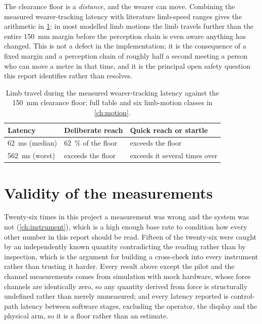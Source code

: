 The clearance floor is a \emph{distance}, and the wearer can move. Combining
the measured wearer-tracking latency with literature limb-speed ranges gives
the arithmetic in \cref{tab:reaction-compact}: in most modelled limb motions
the limb travels further than the entire \SI{150}{\milli\metre} margin before
the perception chain is even aware anything has changed. This is not a
defect in the implementation; it is the consequence of a fixed margin and a
perception chain of roughly half a second meeting a person who can move a
metre in that time, and it is the principal open safety question this report
identifies rather than resolves.

\begin{table}[htbp]
  \centering
  \small
  \caption[The reaction budget, condensed]{Limb travel during the measured
  wearer-tracking latency against the \SI{150}{\milli\metre} clearance floor;
  full table and six limb-motion classes in \cref{ch:motion}.}
  \label{tab:reaction-compact}
  \begin{tabular}{@{}lll@{}}
    \toprule
    Latency & Deliberate reach & Quick reach or startle \\
    \midrule
    \SI{62}{\milli\second} (median) & \SI{62}{\percent} of the floor & exceeds the floor \\
    \SI{562}{\milli\second} (worst) & exceeds the floor & exceeds it several times over \\
    \bottomrule
  \end{tabular}
\end{table}

\section{Validity of the measurements}

Twenty-six times in this project a measurement was wrong and the system was
not (\cref{ch:instrument}), which is a high enough base rate to condition how
every other number in this report should be read. Fifteen of the
twenty-six were caught by an independently known quantity contradicting the
reading rather than by inspection, which is the argument for building a
cross-check into every instrument rather than trusting it harder. Every
result above except the pilot and the channel measurements comes from
simulation with mock hardware, whose force channels are identically zero, so
any quantity derived from force is structurally undefined rather than merely
unmeasured; and every latency reported is control-path latency between
software stages, excluding the operator, the display and the physical arm,
so it is a floor rather than an estimate.

